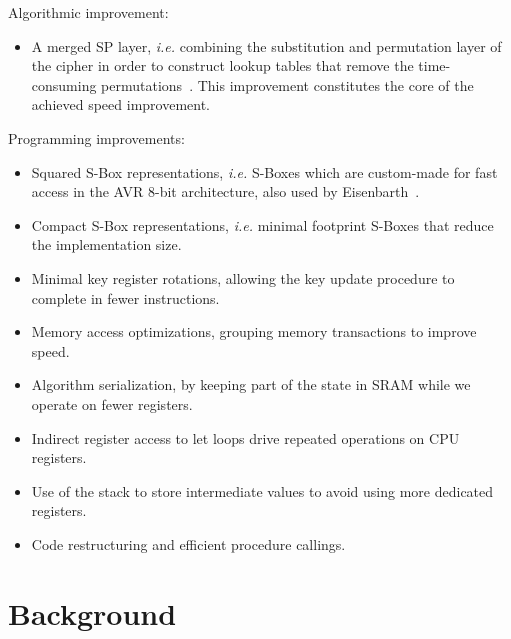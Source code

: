 \documentclass[11pt]{llncs2e} %
\begin{document}
Algorithmic improvement:
\begin{itemize}[nolistsep]
  \item A merged SP layer, \emph{i.e.} combining the substitution and permutation layer of the cipher in order to construct lookup tables that remove the time-consuming permutations~\cite{gong_code,gong2009towards}. This improvement constitutes the core of the achieved speed improvement.
\end{itemize}
Programming improvements:
\begin{itemize}[nolistsep]
  \item Squared S-Box representations, \emph{i.e.} S-Boxes which are custom-made for fast access in the AVR 8-bit architecture, also used by Eisenbarth~\cite{eisenbarth2012compact}.
  \item Compact S-Box representations, \emph{i.e.} minimal footprint S-Boxes that reduce the implementation size.
  \item Minimal key register rotations, allowing the key update procedure to complete in fewer instructions.
  \item Memory access optimizations, grouping memory transactions to improve speed.
  \item Algorithm serialization, by keeping part of the state in SRAM while we operate on fewer registers.
  \item Indirect register access to let loops drive repeated operations on CPU registers.
  \item Use of the stack to store intermediate values to avoid using more dedicated registers.
  \item Code restructuring and efficient procedure callings.
\end{itemize}

\section{Background}
\end{document}
